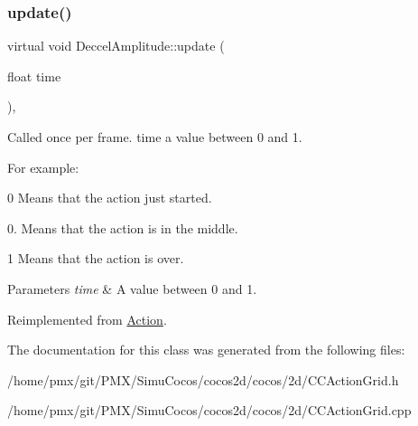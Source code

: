 \subsubsection{\texorpdfstring{update()}{update()}\hspace{0.1cm}{\footnotesize\ttfamily [2/2]}}
{\footnotesize\ttfamily virtual void Deccel\+Amplitude\+::update (\begin{DoxyParamCaption}\item[{float}]{time }\end{DoxyParamCaption})\hspace{0.3cm}{\ttfamily [override]}, {\ttfamily [virtual]}}

Called once per frame. time a value between 0 and 1.

For example\+:
\begin{DoxyItemize}
\item 0 Means that the action just started.
\item 0. Means that the action is in the middle.
\item 1 Means that the action is over.
\end{DoxyItemize}


\begin{DoxyParams}{Parameters}
{\em time} & A value between 0 and 1. \\
\hline
\end{DoxyParams}


Reimplemented from \hyperlink{classAction_a937e646e63915e33ad05ba149bfcf239}{Action}.



The documentation for this class was generated from the following files\+:\begin{DoxyCompactItemize}
\item 
/home/pmx/git/\+P\+M\+X/\+Simu\+Cocos/cocos2d/cocos/2d/C\+C\+Action\+Grid.\+h\item 
/home/pmx/git/\+P\+M\+X/\+Simu\+Cocos/cocos2d/cocos/2d/C\+C\+Action\+Grid.\+cpp\end{DoxyCompactItemize}

